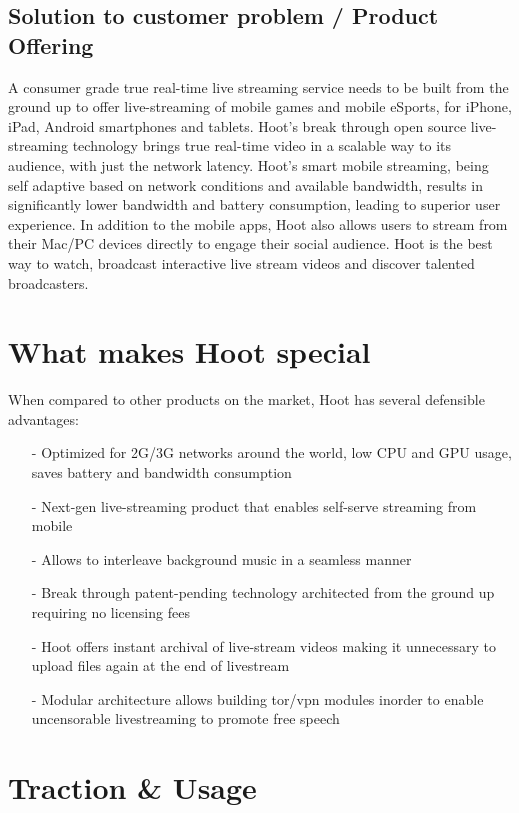 \documentclass{article}
\begin{document}
\subsection{Solution to customer problem / Product Offering}
A consumer grade true real-time live streaming service needs to be
built from the ground up to offer live-streaming of mobile games and
mobile eSports, for iPhone, iPad, Android smartphones and
tablets. Hoot's break through open source live-streaming technology brings true real-time video in a scalable way to its audience, with just the network latency. Hoot's smart mobile streaming, being self adaptive based on network conditions and available bandwidth, results in significantly lower bandwidth and battery consumption, leading to superior user experience. In addition to the mobile apps, Hoot also allows users to stream from their Mac/PC devices directly to engage their social audience. Hoot is the best way to watch, broadcast interactive live stream videos and discover talented broadcasters.

\section{What makes Hoot special}
When compared to other products on the market, Hoot has several defensible advantages:
\begin{itemize}
\item[-]Optimized for 2G/3G networks around the world, low CPU and GPU usage, saves battery and bandwidth consumption
\item[-]Next-gen live-streaming product that enables self-serve streaming from mobile
\item[-]Allows to interleave background music in a seamless manner
\item[-]Break through patent-pending technology architected from the
  ground up requiring no licensing fees
\item[-]Hoot offers instant archival of live-stream videos making it unnecessary to upload files again at the end of livestream
\item[-]Modular architecture allows building tor/vpn modules inorder
  to enable uncensorable livestreaming to promote free speech
\end{itemize}


\section{Traction \& Usage}
\end{document}
